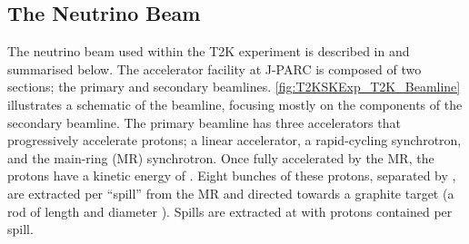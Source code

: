 \subsection{The Neutrino Beam}
\label{subsec:T2KSKExp_T2K_NeutrinoBeam}

The neutrino beam used within the T2K experiment is described in \cite{t2k_det, PhysRevD.87.012001} and summarised below. The accelerator facility at J-PARC is composed of two sections; the primary and secondary beamlines. \autoref{fig:T2KSKExp_T2K_Beamline} illustrates a schematic of the beamline, focusing mostly on the components of the secondary beamline. The primary beamline has three accelerators that progressively accelerate protons; a linear accelerator, a rapid-cycling synchrotron, and the main-ring (MR) synchrotron. Once fully accelerated by the MR, the protons have a kinetic energy of . Eight bunches of these protons, separated by , are extracted per ``spill'' from the MR and directed towards a graphite target (a rod of length  and diameter ).
Spills are extracted at  with  protons contained per spill.

